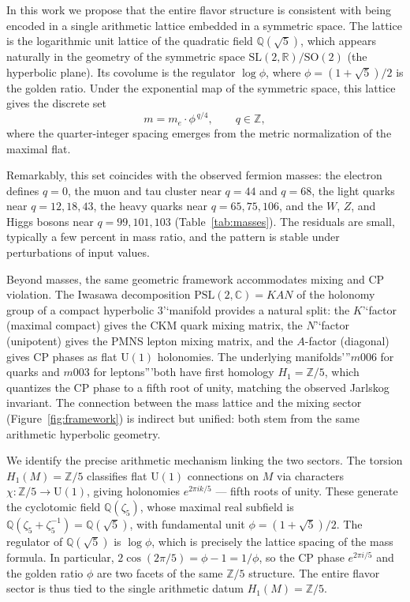 ﻿\documentclass[12pt]{article}
\theoremstyle{definition}
\begin{document}
In this work we propose that the entire flavor structure is consistent with being encoded in a single arithmetic lattice embedded in a symmetric space. The lattice is the logarithmic unit lattice of the quadratic field $\mathbb{Q}(\sqrt5)$, which appears naturally in the geometry of the symmetric space $\mathrm{SL}(2,\mathbb{R})/\mathrm{SO}(2)$ (the hyperbolic plane). Its covolume is the regulator $\log\phi$, where $\phi = (1+\sqrt5)/2$ is the golden ratio. Under the exponential map of the symmetric space, this lattice gives the discrete set
\[
m = m_e \cdot \phi^{\,q/4},\qquad q\in\mathbb{Z},
\]
where the quarter-integer spacing emerges from the metric normalization of the maximal flat.

Remarkably, this set coincides with the observed fermion masses: the electron defines $q=0$, the muon and tau cluster near $q=44$ and $q=68$, the light quarks near $q=12,18,43$, the heavy quarks near $q=65,75,106$, and the $W$, $Z$, and Higgs bosons near $q=99,101,103$ (Table~\ref{tab:masses}). The residuals are small, typically a few percent in mass ratio, and the pattern is stable under perturbations of input values.

Beyond masses, the same geometric framework accommodates mixing and CP violation. The Iwasawa decomposition $\mathrm{PSL}(2,\mathbb{C}) = KAN$ of the holonomy group of a compact hyperbolic 3'`manifold provides a natural split: the $K$'`factor (maximal compact) gives the CKM quark mixing matrix, the $N$'`factor (unipotent) gives the PMNS lepton mixing matrix, and the $A$-factor (diagonal) gives CP phases as flat $\mathrm{U}(1)$ holonomies. The underlying manifolds'''$m006$ for quarks and $m003$ for leptons'''both have first homology $H_1 = \mathbb{Z}/5$, which quantizes the CP phase to a fifth root of unity, matching the observed Jarlskog invariant. The connection between the mass lattice and the mixing sector (Figure~\ref{fig:framework}) is indirect but unified: both stem from the same arithmetic hyperbolic geometry.

We identify the precise arithmetic mechanism linking the two sectors. The torsion $H_1(M)=\mathbb{Z}/5$ classifies flat $\mathrm{U}(1)$ connections on $M$ via characters $\chi: \mathbb{Z}/5 \to \mathrm{U}(1)$, giving holonomies $e^{2\pi i k/5}$ --- fifth roots of unity. These generate the cyclotomic field $\mathbb{Q}(\zeta_5)$, whose maximal real subfield is $\mathbb{Q}(\zeta_5 + \zeta_5^{-1}) = \mathbb{Q}(\sqrt{5})$, with fundamental unit $\phi = (1+\sqrt{5})/2$. The regulator of $\mathbb{Q}(\sqrt{5})$ is $\log\phi$, which is precisely the lattice spacing of the mass formula. In particular, $2\cos(2\pi/5) = \phi - 1 = 1/\phi$, so the CP phase $e^{2\pi i/5}$ and the golden ratio $\phi$ are two facets of the same $\mathbb{Z}/5$ structure. The entire flavor sector is thus tied to the single arithmetic datum $H_1(M) = \mathbb{Z}/5$.
\end{document}
